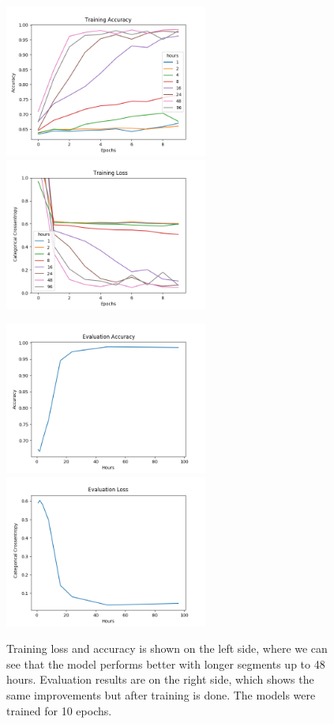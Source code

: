 \begin{figure}
      \begin{multicols}{2}
            \includegraphics[height=5cm]{img/control_condition/plot_acc_train.png}
            \includegraphics[height=5cm]{img/control_condition/plot_loss_train.png}

            \includegraphics[height=5cm]{img/control_condition/plot_acc_eval.png}
            \includegraphics[height=5cm]{img/control_condition/plot_loss_eval.png}
      \end{multicols}
      \caption{Training loss and accuracy is shown on the left side, where we can see that the model performs better with longer segments up to 48 hours. Evaluation results are on the right side, which shows the same improvements but after training is done. The models were trained for 10 epochs.}
      \label{figure:control_condition_10e}
\end{figure}


